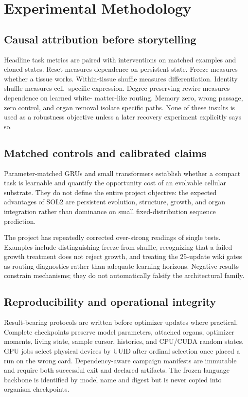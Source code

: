 \documentclass[11pt]{article}
\newcommand{\soltwo}{\textsf{SOL2}}
\begin{document}
\section{Experimental Methodology}

\subsection{Causal attribution before storytelling}

Headline task metrics are paired with interventions on matched examples and cloned
states. Reset measures dependence on persistent state. Freeze measures whether a tissue
works. Within-tissue shuffle measures differentiation. Identity shuffle measures cell-
specific expression. Degree-preserving rewire measures dependence on learned white-
matter-like routing. Memory zero, wrong passage, zero control, and organ removal isolate
specific paths. None of these insults is used as a robustness objective unless a later
recovery experiment explicitly says so.

\subsection{Matched controls and calibrated claims}

Parameter-matched GRUs and small transformers establish whether a compact task is
learnable and quantify the opportunity cost of an evolvable cellular substrate. They do
not define the entire project objective: the expected advantages of
\soltwo{} are persistent evolution, structure, growth, and organ integration rather
than dominance on small fixed-distribution sequence prediction.

The project has repeatedly corrected over-strong readings of single tests. Examples
include distinguishing freeze from shuffle, recognizing that a failed growth treatment
does not reject growth, and treating the 25-update wiki gates as routing diagnostics
rather than adequate learning horizons. Negative results constrain mechanisms; they do
not automatically falsify the architectural family.

\subsection{Reproducibility and operational integrity}

Result-bearing protocols are written before optimizer updates where practical. Complete
checkpoints preserve model parameters, attached organs, optimizer moments, living state,
sample cursor, histories, and CPU/CUDA random states. GPU jobs select physical devices
by UUID after ordinal selection once placed a run on the wrong card. Dependency-aware
campaign manifests are immutable and require both successful exit and declared artifacts.
The frozen language backbone is identified by model name and digest but is never copied
into organism checkpoints.
\end{document}
